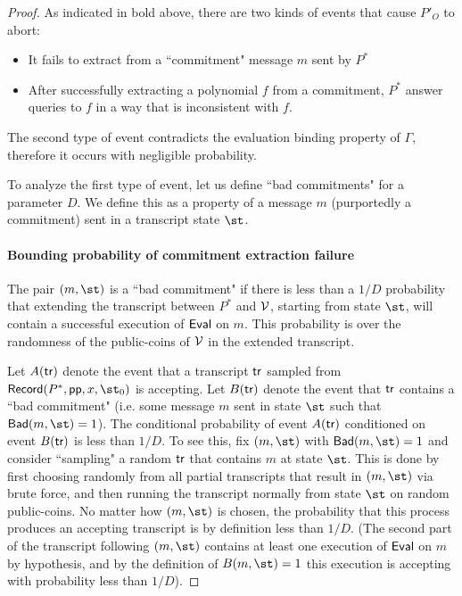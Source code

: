 \begin{proof}
As indicated in bold above, there are two kinds of events that cause $P'_O$ to abort: 
\begin{itemize}
\item It fails to extract from a ``commitment" message $m$ sent by $P^*$
\item After successfully extracting a polynomial $f$ from a commitment, $P^*$ answer queries to $f$ in a way that is inconsistent with $f$. 
\end{itemize}

The second type of event contradicts the evaluation binding property of $\Gamma$, therefore it occurs with negligible probability. 

To analyze the first type of event, let us define ``bad commitments" for a parameter $D$. We define this as a property of a message $m$ (purportedly a commitment) sent in a transcript state $\st$.

\paragraph{Bounding probability of commitment extraction failure} 
The pair $(m, \st)$ is a ``bad commitment" if there is less than a $1/D$ probability that extending the transcript between $P^*$ and $\mathcal{V}$, starting from state $\st$, will contain a successful execution of $\textsf{{Eval}}$ on $m$. This probability is over the randomness of the public-coins of $\mathcal{V}$ in the extended transcript. %


Let $A(\textsf{{tr}})$ denote the event that a transcript $\textsf{{tr}}$ sampled from $\pro{Record}(P^*, \params, x, \st_0)$ is accepting. Let $B(\textsf{{tr}})$ denote the event that $\textsf{{tr}}$ contains a ``bad commitment" (i.e. some message $m$ sent in state $\st$ such that $\pro{Bad}(m, \st) = 1$). The conditional probability of event $A(\textsf{{tr}})$ conditioned on event $B(\textsf{{tr}})$ is less than $1/D$. To see this, fix $(m, \st)$ with $\pro{Bad}(m, \st) = 1$ and consider ``sampling" a random $\textsf{{tr}}$ that contains $m$ at state $\st$. This is done by first choosing randomly from all partial transcripts that result in $(m, \st)$ via brute force, and then running the transcript normally from state $\st$ on random public-coins. No matter how $(m, \st)$ is chosen, the probability that this process produces an accepting transcript is by definition less than $1/D$. (The second part of the transcript following $(m, \st)$ contains at least one execution of $\textsf{{Eval}}$ on $m$ by hypothesis, and by the definition of $B(m, \st) = 1$ this execution is accepting with probability less than $1/D$).


\end{proof}

